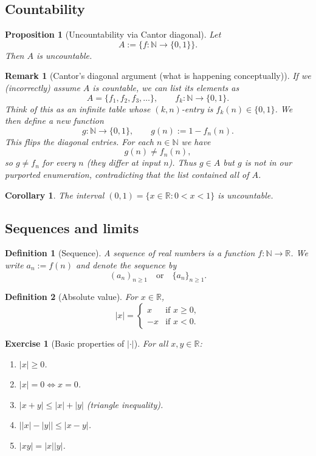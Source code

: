 \documentclass[12pt]{article}
\newtheorem*{remark}{Remark}
\newtheorem{proposition}{Proposition}
\newtheorem{corollary}{Corollary}
\newtheorem{definition}{Definition}
\newtheorem{exercise}{Exercise}
\begin{document}
\subsection*{Countability}

\begin{proposition}[Uncountability via Cantor diagonal]
Let
\[
A:=\{f:\mathbb{N}\to\{0,1\}\}.
\]
Then $A$ is uncountable.
\end{proposition}

\begin{remark}[Cantor's diagonal argument (what is happening conceptually)]
If we (incorrectly) assume $A$ is countable, we can list its elements as
\[
A=\{f_1,f_2,f_3,\dots\},\qquad f_k:\mathbb{N}\to\{0,1\}.
\]
Think of this as an infinite table whose $(k,n)$-entry is $f_k(n)\in\{0,1\}$.  We then \emph{define a new function}
\[
g:\mathbb{N}\to\{0,1\},\qquad g(n):=1-f_n(n).
\]
This flips the diagonal entries.  For each $n\in\mathbb{N}$ we have
\[
g(n)\ne f_n(n),
\]
so $g\ne f_n$ for every $n$ (they differ at input $n$).  Thus $g\in A$ but $g$ is not in our purported enumeration, contradicting that the list contained all of $A$.
\end{remark}

\begin{corollary}
The interval $(0,1)=\{x\in\mathbb{R}:0<x<1\}$ is uncountable.
\end{corollary}

\subsection*{Sequences and limits}

\begin{definition}[Sequence]
A \emph{sequence of real numbers} is a function $f:\mathbb{N}\to\mathbb{R}$.  We write $a_n:=f(n)$ and denote the sequence by
\[
(a_n)_{n\ge 1}\quad\text{or}\quad \{a_n\}_{n\ge 1}.
\]
\end{definition}

\begin{definition}[Absolute value]
For $x\in\mathbb{R}$,
\[
|x|=
\begin{cases}
 x & \text{if }x\ge 0,\\
 -x & \text{if }x<0.
\end{cases}
\]
\end{definition}

\begin{exercise}[Basic properties of $|\cdot|$]
For all $x,y\in\mathbb{R}$:
\begin{enumerate}
\item $|x|\ge 0$.
\item $|x|=0\iff x=0$.
\item $|x+y|\le |x|+|y|$ \;(triangle inequality).
\item $\bigl||x|-|y|\bigr|\le |x-y|$.
\item $|xy|=|x||y|$.
\end{enumerate}
\end{exercise}
\end{document}

